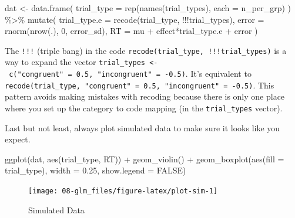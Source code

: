 \documentclass[
  oneside]{book}
\newenvironment{Shaded}{\begin{snugshade}}{\end{snugshade}}
\newcommand{\AttributeTok}[1]{\textcolor[rgb]{0.77,0.63,0.00}{#1}}
\newcommand{\ConstantTok}[1]{\textcolor[rgb]{0.00,0.00,0.00}{#1}}
\newcommand{\DecValTok}[1]{\textcolor[rgb]{0.00,0.00,0.81}{#1}}
\newcommand{\FloatTok}[1]{\textcolor[rgb]{0.00,0.00,0.81}{#1}}
\newcommand{\FunctionTok}[1]{\textcolor[rgb]{0.00,0.00,0.00}{#1}}
\newcommand{\NormalTok}[1]{#1}
\newcommand{\OtherTok}[1]{\textcolor[rgb]{0.56,0.35,0.01}{#1}}
\newcommand{\SpecialCharTok}[1]{\textcolor[rgb]{0.00,0.00,0.00}{#1}}
\begin{document}
\begin{Shaded}
\begin{Highlighting}[]
\NormalTok{dat }\OtherTok{\textless{}{-}} \FunctionTok{data.frame}\NormalTok{(}
  \AttributeTok{trial\_type =} \FunctionTok{rep}\NormalTok{(}\FunctionTok{names}\NormalTok{(trial\_types), }\AttributeTok{each =}\NormalTok{ n\_per\_grp)}
\NormalTok{) }\SpecialCharTok{\%\textgreater{}\%}
  \FunctionTok{mutate}\NormalTok{(}
    \AttributeTok{trial\_type.e =} \FunctionTok{recode}\NormalTok{(trial\_type, }\SpecialCharTok{!!!}\NormalTok{trial\_types),}
    \AttributeTok{error =} \FunctionTok{rnorm}\NormalTok{(}\FunctionTok{nrow}\NormalTok{(.), }\DecValTok{0}\NormalTok{, error\_sd),}
    \AttributeTok{RT =}\NormalTok{ mu }\SpecialCharTok{+}\NormalTok{ effect}\SpecialCharTok{*}\NormalTok{trial\_type.e }\SpecialCharTok{+}\NormalTok{ error}
\NormalTok{  )}
\end{Highlighting}
\end{Shaded}

\begin{info}
The \texttt{!!!} (triple bang) in the code \texttt{recode(trial\_type,\ !!!trial\_types)} is a way to expand the vector \texttt{trial\_types\ \textless{}-\ c("congruent"\ =\ 0.5,\ "incongruent"\ =\ -0.5)}. It's equivalent to \texttt{recode(trial\_type,\ "congruent"\ =\ 0.5,\ "incongruent"\ =\ -0.5)}. This pattern avoids making mistakes with recoding because there is only one place where you set up the category to code mapping (in the \texttt{trial\_types} vector).

\end{info}

Last but not least, always plot simulated data to make sure it looks like you expect.

\begin{Shaded}
\begin{Highlighting}[]
\FunctionTok{ggplot}\NormalTok{(dat, }\FunctionTok{aes}\NormalTok{(trial\_type, RT)) }\SpecialCharTok{+} 
  \FunctionTok{geom\_violin}\NormalTok{() }\SpecialCharTok{+}
  \FunctionTok{geom\_boxplot}\NormalTok{(}\FunctionTok{aes}\NormalTok{(}\AttributeTok{fill =}\NormalTok{ trial\_type), }
               \AttributeTok{width =} \FloatTok{0.25}\NormalTok{, }\AttributeTok{show.legend =} \ConstantTok{FALSE}\NormalTok{)}
\end{Highlighting}
\end{Shaded}

\begin{figure}

{\centering \texttt{[image: 08-glm\_files/figure-latex/plot-sim-1]} 

}

\caption{Simulated Data}\label{fig:plot-sim}
\end{figure}
\end{document}
